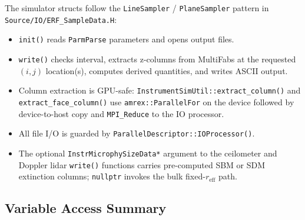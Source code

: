 \documentclass[11pt,letterpaper]{article}
\begin{document}
The simulator structs follow the \texttt{LineSampler} / \texttt{PlaneSampler} pattern in
\texttt{Source/IO/ERF\_SampleData.H}:
\begin{itemize}
  \item \texttt{init()} reads \texttt{ParmParse} parameters and opens output files.
  \item \texttt{write()} checks interval, extracts z-columns from MultiFabs at the
        requested $(i,j)$ location(s), computes derived quantities, and writes ASCII output.
  \item Column extraction is GPU-safe: \texttt{InstrumentSimUtil::extract\_column()} and
        \texttt{extract\_face\_column()} use \texttt{amrex::ParallelFor} on the device
        followed by device-to-host copy and \texttt{MPI\_Reduce} to the IO processor.
  \item All file I/O is guarded by \texttt{ParallelDescriptor::IOProcessor()}.
  \item The optional \texttt{InstrMicrophySizeData*} argument to the ceilometer and
        Doppler lidar \texttt{write()} functions carries pre-computed SBM or SDM
        extinction columns; \texttt{nullptr} invokes the bulk fixed-$r_\mathrm{eff}$ path.
\end{itemize}

\subsection{Variable Access Summary}
\end{document}
